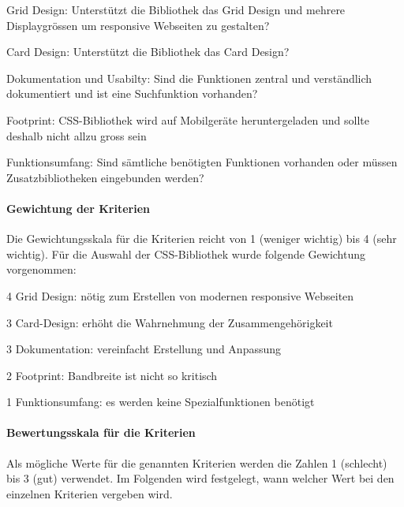 \begin{itemize*}
\item Grid Design: Unterstützt die Bibliothek das Grid Design und mehrere Displaygrössen um responsive Webseiten zu gestalten?
\item Card Design: Unterstützt die Bibliothek das Card Design?
\item Dokumentation und Usabilty: Sind die Funktionen zentral und verständlich dokumentiert und ist eine Suchfunktion vorhanden?
\item Footprint: CSS-Bibliothek wird auf Mobilgeräte heruntergeladen und sollte deshalb nicht allzu gross sein
\item Funktionsumfang: Sind sämtliche benötigten Funktionen vorhanden oder müssen Zusatzbibliotheken eingebunden werden?
\end{itemize*}


\paragraph*{Gewichtung der Kriterien}
Die Gewichtungsskala für die Kriterien reicht von 1 (weniger wichtig) bis 4 (sehr wichtig). Für die Auswahl der CSS-Bibliothek wurde folgende Gewichtung vorgenommen:

\begin{itemize*}
\item 4 Grid Design: nötig zum Erstellen von modernen responsive Webseiten
\item 3 Card-Design: erhöht die Wahrnehmung der Zusammengehörigkeit
\item 3 Dokumentation: vereinfacht Erstellung und Anpassung
\item 2 Footprint: Bandbreite ist nicht so kritisch
\item 1 Funktionsumfang: es werden keine Spezialfunktionen benötigt
\end{itemize*}


\paragraph*{Bewertungsskala für die Kriterien}
Als mögliche Werte für die genannten Kriterien werden die Zahlen 1 (schlecht) bis 3 (gut) verwendet. Im Folgenden wird festgelegt, wann welcher Wert bei den einzelnen Kriterien vergeben wird.

